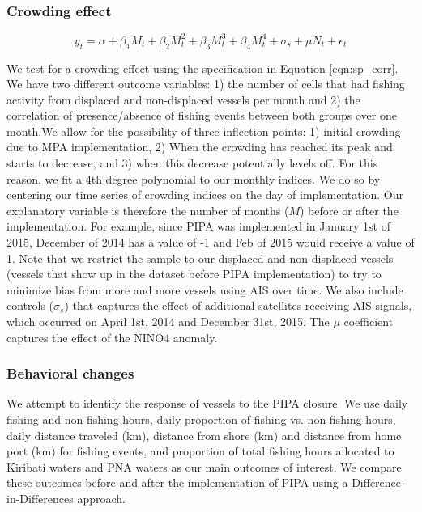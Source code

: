 \documentclass[12pt]{article}
\begin{document}
\subsubsection{Crowding effect}

$$
y_t = \alpha + \beta_1 M_t + \beta_2 M_t^2 + \beta_3 M_t^3 + \beta_4 M_t ^4 + \sigma_s + \mu N_t + \epsilon_t
\label{eqn:sp_corr}
$$

We test for a crowding effect using the specification in Equation \ref{eqn:sp_corr}. We have two different outcome variables:
1) the number of cells that had fishing activity from displaced and non-displaced vessels per month and 2) the correlation of presence/absence of fishing events between both groups over one month.We allow for the possibility of three inflection points: 1) initial crowding due to MPA implementation, 2) When the crowding has reached its peak and starts to decrease, and 3) when this decrease potentially levels off. For this reason, we fit a 4th degree polynomial to our monthly indices. We do so by centering our time series of crowding indices on the day of implementation. Our explanatory variable is therefore the number of months ($M$) before or after the implementation. For example, since PIPA was implemented in January 1st of 2015, December of 2014 has a value of -1 and Feb of 2015 would receive a value of 1. Note that we restrict the sample to our displaced and non-displaced vessels (vessels that show up in the dataset before PIPA implementation) to try to minimize bias from more and more vessels using AIS over time. We also include controls ($\sigma_s$) that captures the effect of additional satellites receiving AIS signals, which occurred on April 1st, 2014 and December 31st, 2015. The $\mu$ coefficient captures the effect of the NINO4 anomaly.

\subsubsection{Behavioral changes}

We attempt to identify the response of vessels to the PIPA closure. We use daily fishing and non-fishing hours, daily proportion of fishing vs. non-fishing hours, daily distance traveled (km), distance from shore (km) and distance from home port (km) for fishing events, and proportion of total fishing hours allocated to Kiribati waters and PNA waters as our main outcomes of interest. We compare these outcomes before and after the implementation of PIPA using a Difference-in-Differences approach.
\end{document}
